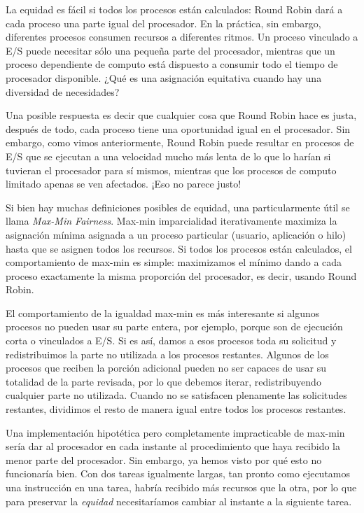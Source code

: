 \documentclass[10pt]{book}
\begin{document}
La equidad es fácil si todos los procesos están calculados: Round Robin dará a cada proceso una parte igual del procesador. En la práctica, sin embargo, diferentes procesos consumen recursos a diferentes ritmos. Un proceso vinculado a E/S puede necesitar sólo una pequeña parte del procesador, mientras que un proceso dependiente de computo está dispuesto a consumir todo el tiempo de procesador disponible. ¿Qué es una asignación equitativa cuando hay una diversidad de necesidades?

Una posible respuesta es decir que cualquier cosa que Round Robin hace es justa, después de todo, cada proceso tiene una oportunidad igual en el procesador. Sin embargo, como vimos anteriormente, Round Robin puede resultar en procesos de E/S que se ejecutan a una velocidad mucho más lenta de lo que lo harían si tuvieran el procesador para sí mismos, mientras que los procesos de computo limitado apenas se ven afectados. ¡Eso no parece justo!

Si bien hay muchas definiciones posibles de equidad, una particularmente útil se llama \textit{Max-Min Fairness}. Max-min imparcialidad iterativamente maximiza la asignación mínima asignada a un proceso particular (usuario, aplicación o hilo) hasta que se asignen todos los recursos. Si todos los procesos están calculados, el comportamiento de max-min es simple: maximizamos el mínimo dando a cada proceso exactamente la misma proporción del procesador, es decir, usando Round Robin.

El comportamiento de la igualdad max-min es más interesante si algunos procesos no pueden usar su parte entera, por ejemplo, porque son de ejecución corta o vinculados a E/S. Si es así, damos a esos procesos toda su solicitud y redistribuimos la parte no utilizada a los procesos restantes. Algunos de los procesos que reciben la porción adicional pueden no ser capaces de usar su totalidad de la parte revisada, por lo que debemos iterar, redistribuyendo cualquier parte no utilizada. Cuando no se satisfacen plenamente las solicitudes restantes, dividimos el resto de manera igual entre todos los procesos restantes.

Una implementación hipotética pero completamente impracticable de max-min sería dar al procesador en cada instante al procedimiento que haya recibido la menor parte del procesador. Sin embargo, ya hemos visto por qué esto no funcionaría bien. Con dos tareas igualmente largas, tan pronto como ejecutamos una instrucción en una tarea, habría recibido más recursos que la otra, por lo que para preservar la \textit{equidad} necesitaríamos cambiar al instante a la siguiente tarea.
\end{document}
